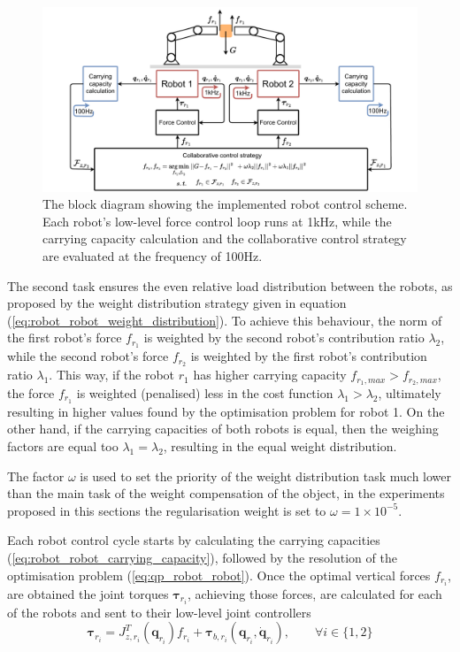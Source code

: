 \begin{figure}[!b]
    \centering
    \includegraphics[width=\linewidth]{Papers/images/schema_robot_robot.pdf}
    \caption{The block diagram showing the implemented robot control scheme. Each robot's low-level force control loop runs at 1kHz, while the carrying capacity calculation and the collaborative control strategy are evaluated at the frequency of 100Hz.}
    \label{fig:schema_robot_robot_control}
\end{figure}


The second task ensures the even relative load distribution between the robots, as proposed by the weight distribution strategy given in equation (\ref{eq:robot_robot_weight_distribution}). To achieve this behaviour, the norm of the first robot's force $f_{r_1}$ is weighted by the second robot's contribution ratio $\lambda_2$, while the second robot's force $f_{r_2}$ is weighted by the first robot's contribution ratio $\lambda_1$. This way, if the robot $r_1$ has higher carrying capacity $f_{r_1,max}>f_{r_2,max}$, the force $f_{r_1}$ is weighted (penalised) less in the cost function $\lambda_1>\lambda_2$, ultimately resulting in higher values found by the optimisation problem for robot 1. On the other hand, if the carrying capacities of both robots is equal, then the weighing factors are equal too $\lambda_1=\lambda_2$, resulting in the equal weight distribution. 

The factor $\omega$ is used to set the priority of the weight distribution task much lower than the main task of the weight compensation of the object, in the experiments proposed in this sections the regularisation weight is set to $\omega=1\times 10^{-5}$.

Each robot control cycle starts by calculating the carrying capacities (\ref{eq:robot_robot_carrying_capacity}), followed by the resolution of the optimisation problem (\ref{eq:qp_robot_robot}). Once the optimal vertical forces $f_{r_i}$, are obtained the joint torques $\bm{\tau}_{r_i}$, achieving those forces, are calculated for each of the robots and sent to their low-level joint controllers 
\begin{equation}
    \bm{\tau}_{r_i} = J_{z,r_i}^T(\bm{q}_{r_i}){f}_{r_i} + \bm{\tau}_{b,r_i}(\bm{q}_{r_i},\dot{\bm{q}}_{r_i}), \qquad \forall i \in \{1,2\}
\end{equation}

